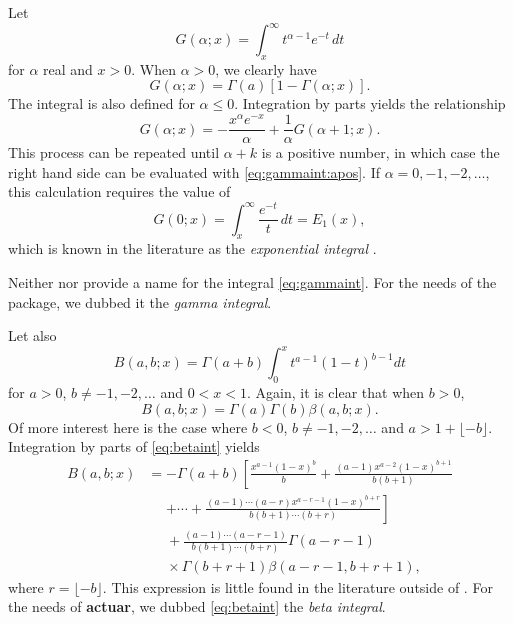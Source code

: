 \documentclass[x11names]{article}
\newcommand{\pkg}[1]{\textbf{#1}}
\begin{document}
Let
\begin{equation}
  \label{eq:gammaint}
  G(\alpha; x) = \int_x^\infty t^{\alpha - 1} e^{-t}\, dt
\end{equation}
for $\alpha$ real and $x > 0$. When $\alpha > 0$, we clearly have
\begin{equation}
  \label{eq:gammaint:apos}
  G(\alpha; x) = \Gamma(a) [1 - \Gamma(\alpha; x)].
\end{equation}
The integral is also defined for $\alpha \le 0$. Integration by parts
yields the relationship
\begin{equation*}
  G(\alpha; x) = -\frac{x^\alpha e^{-x}}{\alpha}
  + \frac{1}{\alpha} G(\alpha + 1; x).
\end{equation*}
This process can be repeated until $\alpha + k$ is a positive number,
in which case the right hand side can be evaluated with
\eqref{eq:gammaint:apos}. If $\alpha = 0, -1, -2, \dots$, this
calculation requires the value of
\begin{equation*}
  \label{eq:expint}
  G(0; x) = \int_x^\infty \frac{e^{-t}}{t}\, dt = E_1(x),
\end{equation*}
which is known in the literature as the \emph{exponential integral}
\citep{Abramowitz:1972}.

Neither \citet{LossModels4e} nor \citet{Abramowitz:1972} provide a
name for the integral \eqref{eq:gammaint}. For the needs of the
package, we dubbed it the \emph{gamma integral}.

Let also
\begin{equation}
  \label{eq:betaint}
  B(a, b; x) = \Gamma(a + b) \int_0^x t^{a-1} (1-t)^{b-1} dt
\end{equation}
for $a > 0$, $b \neq -1, -2, \dots$ and $0 < x < 1$. Again, it is
clear that when $b > 0$,
\begin{equation*}
  B(a, b; x) = \Gamma(a) \Gamma(b) \beta(a, b; x).
\end{equation*}
Of more interest here is the case where $b < 0$,
$b \neq -1, -2, \dots$ and $a > 1 + \lfloor -b\rfloor$. Integration by
parts of \eqref{eq:betaint} yields
\begin{equation*}
  \begin{split}
    B(a, b; x)
    &= \displaystyle
    -\Gamma(a + b) \left[ \frac{x^{a-1} (1-x)^b}{b}
      + \frac{(a-1) x^{a-2} (1-x)^{b+1}}{b (b+1)} \right. \\
    &\phantom{=} \displaystyle\left.
      + \cdots + \frac{(a-1) \cdots (a-r) x^{a-r-1}
        (1-x)^{b+r}}{b (b+1) \cdots (b+r)} \right] \\
    &\phantom{=} \displaystyle
    + \frac{(a-1) \cdots (a-r-1)}{b (b+1) \cdots (b+r)}
    \Gamma(a-r-1) \\
    &\phantom{=} \times \Gamma(b+r+1) \beta(a-r-1, b+r+1),
  \end{split}
\end{equation*}
where $r = \lfloor -b\rfloor$. This expression is little found in the
literature outside of \citet{LossModels4e}. For the needs of
\pkg{actuar}, we dubbed \eqref{eq:betaint} the \emph{beta
  integral}.
\end{document}
